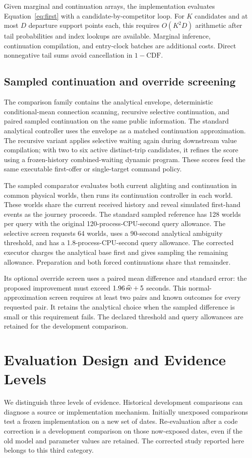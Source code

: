 \documentclass[preprint,12pt,authoryear]{elsarticle}
\begin{document}
Given marginal and continuation arrays, the implementation evaluates
Equation~\ref{eq:first} with a candidate-by-competitor loop. For $K$ candidates
and at most $D$ departure support points each, this requires $O(K^2D)$ arithmetic
after tail probabilities and index lookups are available. Marginal inference,
continuation compilation, and entry-clock batches are additional costs. Direct
nonnegative tail sums avoid cancellation in $1-\mathrm{CDF}$.

\subsection{Sampled continuation and override screening}
The comparison family contains the analytical envelope, deterministic
conditional-mean connection scanning, recursive selective continuation, and
paired sampled continuation on the same public information. The standard
analytical controller uses the envelope as a matched continuation approximation.
The recursive variant applies selective waiting again during downstream value
compilation; with two to six active distinct-trip candidates, it refines the
score using a frozen-history combined-waiting dynamic program. These scores feed
the same executable first-offer or single-target command policy.

The sampled comparator evaluates both current alighting and continuation in
common physical worlds, then runs its continuation controller in each world.
These worlds share the current received history and reveal simulated first-hand
events as the journey proceeds. The standard
sampled reference has 128 worlds per query with the original 120-process-CPU-second
query allowance. The selective screen requests 64 worlds, uses a 90-second
analytical ambiguity threshold, and has a 1.8-process-CPU-second query allowance.
The corrected executor charges the analytical base first and gives sampling the
remaining allowance. Preparation and both forced continuations share that
remainder.

Its optional override screen uses a paired mean difference and standard error:
the proposed improvement must exceed $1.96\,\widehat{\rm se}+5$ seconds.
This normal-approximation screen requires at least two pairs and known outcomes
for every requested pair. It retains the analytical choice when the sampled
difference is small or this requirement fails. The declared threshold and
query allowances are retained for the development comparison.

\section{Evaluation Design and Evidence Levels}
We distinguish three levels of evidence. Historical development comparisons can
diagnose a source or implementation mechanism. Initially unexposed comparisons
test a frozen implementation on a new set of dates. Re-evaluation after a code
correction is a development comparison on those now-exposed dates, even if the
old model and parameter values are retained. The corrected study reported here
belongs to this third category.
\end{document}

